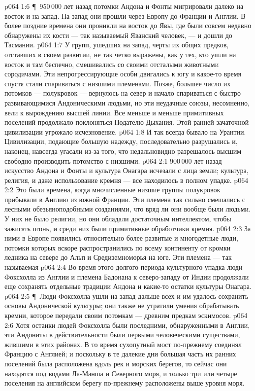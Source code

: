 \vs p064 1:6 \P\ 950\,000 лет назад потомки Андона и Фонты мигрировали далеко на восток и на запад. На запад они прошли через Европу до Франции и Англии. В более поздние времена они проникли на восток до Явы, где были совсем недавно обнаружены их кости --- так называемый Яванский человек, --- и дошли до Тасмании.
\vs p064 1:7 У групп, ушедших на запад, черты их общих предков, отставших в своем развитии, не так четко выражены, как у тех, кто ушли на восток и там беспечно, смешивались со своими отсталыми животными сородичами. Эти непрогрессирующие особи двигались к югу и какое\hyp{}то время спустя стали спариваться с низшими племенами. Позже, большее число их потомков --- полукровок --- вернулось на север и начало спариваться с быстро развивающимися Андоническими людьми, но эти неудачные союзы, несомненно, вели к вырождению высшей линии. Все меньше и меньше примитивных поселений продолжало поклоняться Подателю Дыхания. Этой ранней зачаточной цивилизации угрожало исчезновение.
\vs p064 1:8 И так всегда бывало на Урантии. Цивилизации, подающие большую надежду, последовательно разрушались и, наконец, навсегда угасали из\hyp{}за того, что недальновидно разрешалось высшим свободно производить потомство с низшими.
\vs p064 2:1 900\,000 лет назад искусство Андона и Фонты и культура Онагара исчезали с лица земли; культура, религия, и даже использование кремня --- все находилось в полном упадке.
\vs p064 2:2 Это были времена, когда мночисленные низшие группы полукровок прибывали в Англию из южной Франции. Эти племена так сильно смешались с лесными обезьяноподобными созданиями, что вряд ли они вообще были людьми. У них не было религии, но они обладали достаточным интеллектом, чтобы зажигать огонь, и среди них были примитивные обработчики кремня.
\vs p064 2:3 За ними в Европе появились относительно более развитые и многодетные люди, потомки которых вскоре распространились по всему континенту от кромки ледника на севере до Альп и Средиземноморья на юге. Эти племена --- так называемая 
\vs p064 2:4 Во время этого долгого периода культурного упадка люди Фоксхолла из Англии и племена Бадонана к северо\hyp{}западу от Индии продолжали еще сохранять отдельные традиции Андона и какие\hyp{}то остатки культуры Онагара.
\vs p064 2:5 \P\ Люди Фоксхолла ушли на запад дальше всех и им удалось сохранить основы Андонической культуры; они также не утратили умения обрабатывать кремни, которое передали своим потомкам --- древним предкам эскимосов.
\vs p064 2:6 Хотя останки людей Фоксхолла были последними, обнаруженными в Англии, эти Андониты в действительности были первыми человеческими существами, жившими в этих районах. В то время сухопутный мост по\hyp{}прежнему соединял Францию с Англией; и поскольку в те далекие дни большая часть их ранних поселений была расположена вдоль рек и морских берегов, то сейчас они находятся под водами Ла\hyp{}Манша и Северного моря, и только три или четыре поселения на английском берегу по\hyp{}прежнему расположены выше уровня моря.
